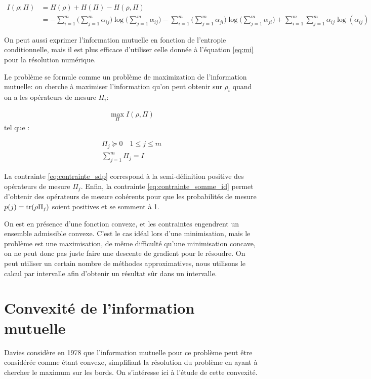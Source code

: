 \begin{align}
    \label{eq:mi}
    I(\rho; \Pi) &= H(\rho) + H(\Pi) - H(\rho, \Pi) \nonumber \\
    &= - \displaystyle \sum_{i=1}^{m} \big(\displaystyle \sum_{j=1}^{m} \alpha_{ij} \big) \log \big( \displaystyle \sum_{j=1}^{m} \alpha_{ij} \big) - \displaystyle \sum_{i=1}^{m} \big(\displaystyle \sum_{j=1}^{m} \alpha_{ji} \big) \log \big( \displaystyle \sum_{j=1}^{m} \alpha_{ji}\big) + \displaystyle \sum_{i=1}^{m} \displaystyle \sum_{j=1}^{m} \alpha_{ij} \log( \alpha_{ij} )
\end{align}

On peut aussi exprimer l'information mutuelle en fonction de l'entropie conditionnelle, mais il est plus efficace d'utiliser celle donnée à l'équation \ref{eq:mi} pour la résolution numérique.

Le problème se formule comme un problème de maximization de l'information mutuelle: on cherche à maximiser l'information qu'on peut obtenir sur $\rho_i$ quand on a les opérateurs de mesure $\Pi_i$:

\begin{align}
    \max\limits_{\Pi} I(\rho, \Pi)
\end{align}
tel que :

\begin{align}
    \Pi_j \succeq 0 \quad 1 \leq j \leq m \label{eq:contrainte_sdp} \\
    \displaystyle \sum_{j=1}^{m} \Pi_j = I \label{eq:contrainte_somme_id}
\end{align}

La contrainte \ref{eq:contrainte_sdp} correspond à la semi-définition positive des opérateurs de mesure $\Pi_j$. Enfin, la contrainte \ref{eq:contrainte_somme_id} permet d'obtenir des opérateurs de mesure cohérents pour que les probabilités de mesure $p(j) = \operatorname{tr} (\rho \Pi_j)$ soient positives et se somment à 1.

On est en présence d'une fonction convexe, et les contraintes engendrent un ensemble admissible convexe. C'est le cas idéal lors d'une minimisation, mais le problème est une maximisation, de même difficulté qu'une minimisation concave, on ne peut donc pas juste faire une descente de gradient pour le résoudre. On peut utiliser un certain nombre de méthodes approximatives, nous utilisons le calcul par intervalle afin d'obtenir un résultat sûr dans un intervalle.

\section{Convexité de l'information mutuelle}
Davies considère en 1978 que l'information mutuelle pour ce problème peut être considérée comme étant convexe, simplifiant la résolution du problème en ayant à chercher le maximum sur les bords. On s'intéresse ici à l'étude de cette convexité.

